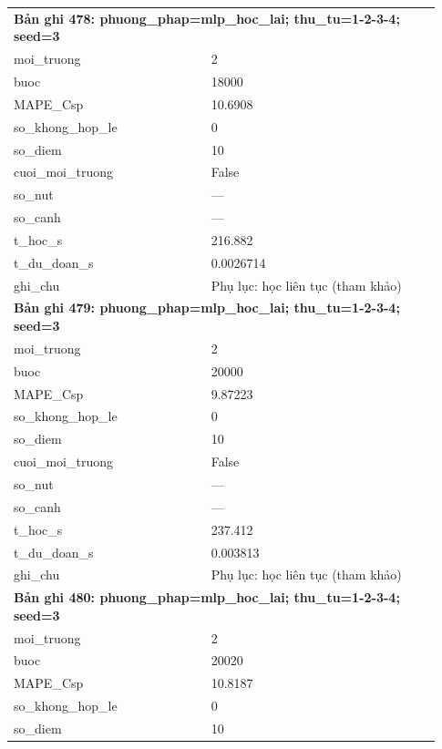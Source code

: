 \begin{longtable}{p{0.43\linewidth}p{0.50\linewidth}}
\midrule
\multicolumn{2}{p{0.95\linewidth}}{\textbf{Bản ghi 478: phuong\_phap=mlp\_hoc\_lai; thu\_tu=1-2-3-4; seed=3}} \\
moi\_\allowbreak truong & 2 \\
buoc & 18000 \\
MAPE\_\allowbreak Csp & 10.6908 \\
so\_\allowbreak khong\_\allowbreak hop\_\allowbreak le & 0 \\
so\_\allowbreak diem & 10 \\
cuoi\_\allowbreak moi\_\allowbreak truong & False \\
so\_\allowbreak nut & — \\
so\_\allowbreak canh & — \\
t\_\allowbreak hoc\_\allowbreak s & 216.882 \\
t\_\allowbreak du\_\allowbreak doan\_\allowbreak s & 0.0026714 \\
ghi\_\allowbreak chu & Phụ lục: học liên tục (tham khảo) \\
\midrule
\multicolumn{2}{p{0.95\linewidth}}{\textbf{Bản ghi 479: phuong\_phap=mlp\_hoc\_lai; thu\_tu=1-2-3-4; seed=3}} \\
moi\_\allowbreak truong & 2 \\
buoc & 20000 \\
MAPE\_\allowbreak Csp & 9.87223 \\
so\_\allowbreak khong\_\allowbreak hop\_\allowbreak le & 0 \\
so\_\allowbreak diem & 10 \\
cuoi\_\allowbreak moi\_\allowbreak truong & False \\
so\_\allowbreak nut & — \\
so\_\allowbreak canh & — \\
t\_\allowbreak hoc\_\allowbreak s & 237.412 \\
t\_\allowbreak du\_\allowbreak doan\_\allowbreak s & 0.003813 \\
ghi\_\allowbreak chu & Phụ lục: học liên tục (tham khảo) \\
\midrule
\multicolumn{2}{p{0.95\linewidth}}{\textbf{Bản ghi 480: phuong\_phap=mlp\_hoc\_lai; thu\_tu=1-2-3-4; seed=3}} \\
moi\_\allowbreak truong & 2 \\
buoc & 20020 \\
MAPE\_\allowbreak Csp & 10.8187 \\
so\_\allowbreak khong\_\allowbreak hop\_\allowbreak le & 0 \\
so\_\allowbreak diem & 10 \\

\end{longtable}
